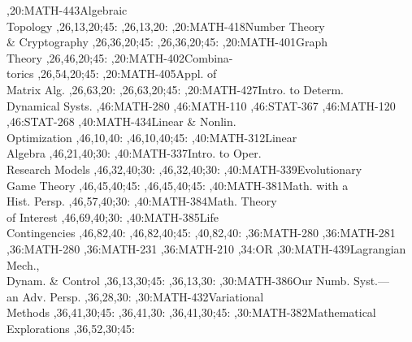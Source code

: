 \documentclass[9pt]{extarticle}
\begin{document}
\begin{chart}
,20:{MATH-443}{Algebraic\\Topology}{}
  ,26,13,20;45:
  ,26,13,20:
,20:{MATH-418}{Number Theory\\\& Cryptography}{}
  ,26,36,20;45:
  ,26,36,20;45:
,20:{MATH-401}{Graph\\Theory}{}
  ,26,46,20;45:
,20:{MATH-402}{Combina-\\torics}{}
  ,26,54,20;45:
,20:{MATH-405}{Appl. of\\Matrix Alg.}{}
  ,26,63,20:
  ,26,63,20;45:
,20:{MATH-427}{Intro. to Determ.\\Dynamical Systs.}{}
,46:{MATH-280}
,46:{MATH-110}
,46:{STAT-367}
,46:{MATH-120}
,46:{STAT-268}
,40:{MATH-434}{Linear \& Nonlin.\\Optimization}{}
  ,46,10,40:
  ,46,10,40;45:
,40:{MATH-312}{Linear\\Algebra}{}
  ,46,21,40;30:
,40:{MATH-337}{Intro. to Oper.\\Research Models}{}
  ,46,32,40;30:
  ,46,32,40;30:
,40:{MATH-339}{Evolutionary\\Game Theory}{}
  ,46,45,40;45:
  ,46,45,40;45:
,40:{MATH-381}{Math. with a\\Hist. Persp.}{}
  ,46,57,40;30:
,40:{MATH-384}{Math. Theory\\of Interest}{}
  ,46,69,40;30:
,40:{MATH-385}{Life\\Contingencies}{}
  ,46,82,40:
  ,46,82,40;45:
  ,40,82,40:
,36:{MATH-280}
,36:{MATH-281}
,36:{MATH-280}
,36:{MATH-231}
,36:{MATH-210}
,34:{OR}
,30:{MATH-439}{Lagrangian Mech.,\\Dynam. \& Control}{}
  ,36,13,30;45:
  ,36,13,30:
,30:{MATH-386}{Our Numb. Syst.---\\an Adv. Persp.}{}
  ,36,28,30:
,30:{MATH-432}{Variational\\Methods}{}
  ,36,41,30;45:
  ,36,41,30:
  ,36,41,30;45:
,30:{MATH-382}{Mathematical\\Explorations}{}
  ,36,52,30;45:

\end{chart}
\end{document}

